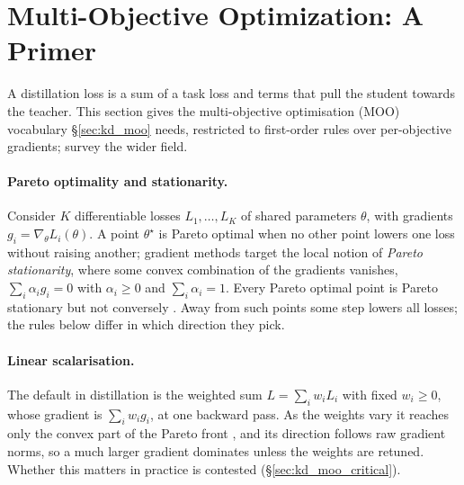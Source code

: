 \section{Multi-Objective Optimization: A Primer}
\label{sec:moo}

A distillation loss is a sum of a task loss and terms that
pull the student towards the teacher. This section gives the multi-objective optimisation (MOO)
vocabulary \S\ref{sec:kd_moo} needs, restricted to first-order rules over per-objective gradients; \citet{chen2026gradmoo} survey the wider field.

\paragraph{Pareto optimality and stationarity.}
Consider $K$ differentiable losses $L_1,\dots,L_K$ of shared parameters $\theta$, with
gradients $g_i=\nabla_\theta L_i(\theta)$. A point $\theta^\star$ is Pareto optimal when no other
point lowers one loss without raising another; gradient methods target the local notion of
\emph{Pareto stationarity}, where some convex combination of the gradients vanishes, $\sum_i\alpha_i g_i=0$ with $\alpha_i\ge0$ and
$\sum_i\alpha_i=1$. Every Pareto optimal point is Pareto stationary but not conversely
\citep{sener2018mgda}. Away from such points some step lowers all losses; the rules below differ in which direction they pick.

\paragraph{Linear scalarisation.}
The default in distillation is the weighted sum $L=\sum_i w_iL_i$ with fixed $w_i\ge0$, whose
gradient is $\sum_i w_ig_i$, at one backward pass. As the weights vary it reaches only the convex
part of the Pareto front \citep{gong2021dbgd}, and its direction follows raw gradient norms, so a
much larger gradient dominates unless the weights are retuned. Whether this matters in practice is
contested (\S\ref{sec:kd_moo_critical}).

